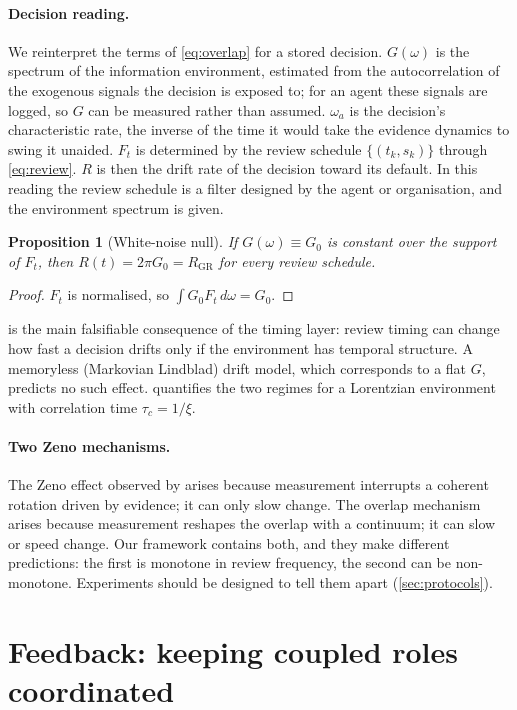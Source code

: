 \documentclass[11pt]{article}
\newtheorem{proposition}{Proposition}
\theoremstyle{definition}
\theoremstyle{remark}
\newcommand{\RGR}{R_{\mathrm{GR}}}
\begin{document}
\paragraph{Decision reading.} We reinterpret the terms of \cref{eq:overlap} for a stored decision. $G(\omega)$ is the spectrum of the information environment, estimated from the autocorrelation of the exogenous signals the decision is exposed to; for an agent these signals are logged, so $G$ can be measured rather than assumed. $\omega_a$ is the decision's characteristic rate, the inverse of the time it would take the evidence dynamics to swing it unaided. $F_t$ is determined by the review schedule $\{(t_k,s_k)\}$ through \cref{eq:review}. $R$ is then the drift rate of the decision toward its default. In this reading the review schedule is a filter designed by the agent or organisation, and the environment spectrum is given.

\begin{proposition}[White-noise null]
\label{prop:null}
If $G(\omega)\equiv G_0$ is constant over the support of $F_t$, then $R(t)=2\pi G_0=\RGR$ for every review schedule.
\end{proposition}
\begin{proof}
$F_t$ is normalised, so $\int G_0F_t\,d\omega=G_0$.
\end{proof}

 is the main falsifiable consequence of the timing layer: review timing can change how fast a decision drifts only if the environment has temporal structure. A memoryless (Markovian Lindblad) drift model, which corresponds to a flat $G$, predicts no such effect.  quantifies the two regimes for a Lorentzian environment with correlation time $\tau_c=1/\xi$.

\paragraph{Two Zeno mechanisms.} The Zeno effect observed by \citet{yearsley2016} arises because measurement interrupts a coherent rotation driven by evidence; it can only slow change. The overlap mechanism arises because measurement reshapes the overlap with a continuum; it can slow or speed change. Our framework contains both, and they make different predictions: the first is monotone in review frequency, the second can be non-monotone. Experiments should be designed to tell them apart (\cref{sec:protocols}).

\section{Feedback: keeping coupled roles coordinated}
\label{sec:feedback}
\end{document}
